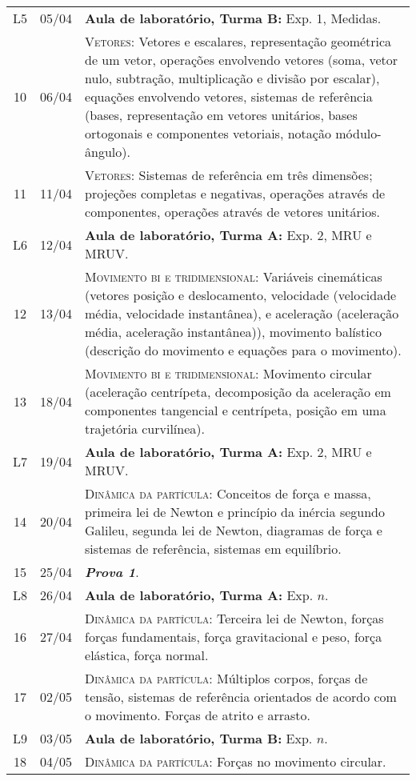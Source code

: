\begin{center}
\begin{longtable}{ccp{70mm}}
L5   &  05/04    &  \textbf{Aula de laboratório, Turma B:} Exp. 1, Medidas. \\
10	 & 	06/04	 & 	\textsc{Vetores:} Vetores e escalares, representação geométrica de um vetor, operações envolvendo vetores (soma, vetor nulo, subtração, multiplicação e divisão por escalar), equações envolvendo vetores, sistemas de referência (bases, representação em vetores unitários, bases ortogonais e componentes vetoriais, notação módulo-ângulo). \\
11	 & 	11/04	 & 	\textsc{Vetores:} Sistemas de referência em três dimensões; projeções completas e negativas, operações através de componentes, operações através de vetores unitários. \\
L6   &  12/04    &  \textbf{Aula de laboratório, Turma A:} Exp. 2, MRU e MRUV. \\
12	 & 	13/04	 & 	\textsc{Movimento bi e tridimensional:} Variáveis cinemáticas (vetores posição e deslocamento, velocidade (velocidade média, velocidade instantânea), e aceleração (aceleração média, aceleração instantânea)), movimento balístico (descrição do movimento e equações para o movimento). \\
13	 & 	18/04	 & 	\textsc{Movimento bi e tridimensional:} Movimento circular (aceleração centrípeta, decomposição da aceleração em componentes tangencial e centrípeta, posição em uma trajetória curvilínea). \\
L7   &  19/04    &  \textbf{Aula de laboratório, Turma A:} Exp. 2, MRU e MRUV. \\
14	 & 	20/04	 & 	\textsc{Dinâmica da partícula:} Conceitos de força e massa, primeira lei de Newton e princípio da inércia segundo Galileu, segunda lei de Newton, diagramas de força e sistemas de referência, sistemas em equilíbrio.\\
15	 & 	25/04	 &  \textbf{\textit{Prova 1}}.\\
L8   &  26/04    &  \textbf{Aula de laboratório, Turma A:} Exp. $n$. \\
16	 & 	27/04	 & 	\textsc{Dinâmica da partícula:} Terceira lei de Newton, forças forças fundamentais, força gravitacional e peso, força elástica, força normal.\\
17	 & 	02/05	 & 	\textsc{Dinâmica da partícula:} Múltiplos corpos, forças de tensão, sistemas de referência orientados de acordo com o movimento. Forças de atrito e arrasto.\\
L9   &  03/05    &  \textbf{Aula de laboratório, Turma B:} Exp. $n$. \\
18	 & 	04/05	 & 	\textsc{Dinâmica da partícula:} Forças no movimento circular. \\

\end{longtable}
\end{center}
